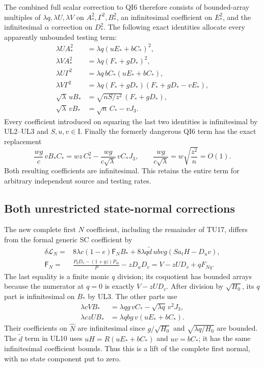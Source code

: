 The combined full scalar correction to QI6 therefore consists of
bounded-array multiples of $\lambda q,\lambda U,\lambda V$
on $A_*^2,\Gamma^2,B_*^2$, an infinitesimal coefficient on
$E_*^2$, and the infinitesimal $\alpha$ correction on $D_*^2$.
The following exact identities allocate every apparently unbounded
testing term:
\[
\begin{aligned}
\lambda U A_*^2&=\lambda q(uE_*+bC_*)^2,\\
\lambda V A_*^2&=\lambda q(F_*+gD_*)^2,\\
\lambda U\Gamma^2&=\lambda q\,bC_*(uE_*+bC_*),\\
\lambda V\Gamma^2&=\lambda q(F_*+gD_*)
                                    (F_*+gD_*-vE_*),\\
\sqrt\lambda\,uB_*&=\sqrt{nS/z^2}\,(F_*+gD_*),\\
\sqrt\lambda\,vB_*&=\sqrt n\,C_*-vJ_3 .
\end{aligned}                                                   \tag{UL8}
\]
Every coefficient introduced on squaring the last two identities
is infinitesimal by UL2--UL3 and $S,u,v\in\mathrm I$.
Finally the formerly dangerous QI6 term has the exact replacement
\[
 \frac{wg}{c}\,vB_*C_*
       =wz\,C_*^2-\frac{wg}{c\sqrt\lambda}\,vC_*J_3,
 \qquad
 \frac{wg}{c\sqrt\lambda}
          =w\sqrt{\frac{z^2}{n}}=O(1).                          \tag{UL9}
\]
Both resulting coefficients are infinitesimal. This retains the
entire term for arbitrary independent source and testing rates.

\subsection{Both unrestricted state-normal corrections}

The new complete first $N$ coefficient, including the remainder
of TU17, differs from the formal generic SC coefficient by
\[
\begin{split}
\delta\mathcal L_N={}&
 8\lambda c(1-e)\mathsf F_N B_*
 +8\lambda q\widetilde d\,ubvg(Sa_tH-D_uv),\\
\mathsf F_N={}&
 \frac{P_bD_v-(1+qz)P_m}{P}-zD_uD_v
                 =V-zUD_v+qF_{Nq}.
\end{split}                                                     \tag{UL10}
\]
The last equality is a finite monic $q$ division; its coquotient
has bounded arrays because the numerator at $q=0$ is exactly
$V-zUD_v$. After division by $\sqrt{H_0}$, its $q$ part is
infinitesimal on $B_*$ by UL3. The other parts use
\[
\begin{split}
\lambda cV B_*&=\lambda qg\,vC_*
                            -\sqrt{\lambda q}\,v^2J_3,\\
\lambda czU B_*&=\lambda qbg\,v(uE_*+bC_*).
\end{split}                                                     \tag{UL11}
\]
Their coefficients on $\widehat N$ are infinitesimal since
$g/\sqrt{H_0}$ and $\sqrt{\lambda q/H_0}$ are bounded.
The $\widetilde d$ term in UL10 uses
$uH=R(uE_*+bC_*)$ and $uv=bC_*$; it has the same
infinitesimal coefficient bounds. Thus this is a lift of the
complete first normal, with no state component put to zero.

